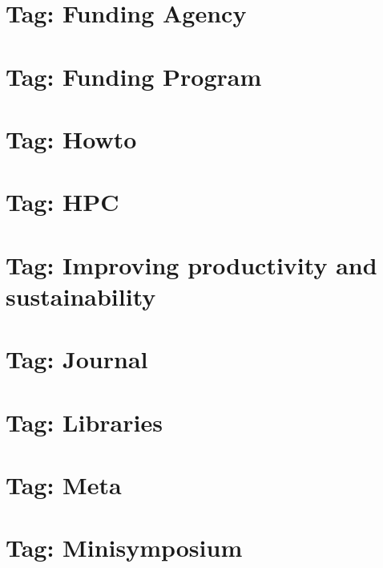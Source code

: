 \documentclass[twoside]{book}
\newcommand{\+}{\discretionary{\mbox{\scriptsize$\hookleftarrow$}}{}{}}
\begin{document}
\chapter{Tag\+: Funding Agency}
\label{md_markdown_tag_funding_agency}

\chapter{Tag\+: Funding Program}
\label{md_markdown_tag_funding_program}

\chapter{Tag\+: Howto}
\label{md_markdown_tag_howto}

\chapter{Tag\+: H\+PC}
\label{md_markdown_tag_hpc}

\chapter{Tag\+: Improving productivity and sustainability}
\label{md_markdown_tag_improving_productivity_and_sustainability}

\chapter{Tag\+: Journal}
\label{md_markdown_tag_journal}

\chapter{Tag\+: Libraries}
\label{md_markdown_tag_libraries}

\chapter{Tag\+: Meta}
\label{md_markdown_tag_meta}

\chapter{Tag\+: Minisymposium}
\label{md_markdown_tag_minisymposium}

\end{document}
